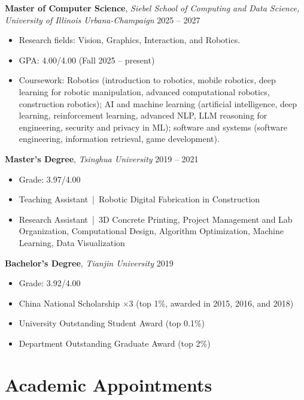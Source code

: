 \documentclass[11pt,a4paper]{article}
\newcommand{\entrytitle}[1]{\textbf{#1}}
\newcommand{\entrydetail}[1]{\textit{#1}}
\begin{document}
\entrytitle{Master of Computer Science}, \entrydetail{Siebel School of Computing and Data Science, University of Illinois Urbana-Champaign} \hfill 2025 -- 2027 \\[-1.5em]
\begin{itemize}[nosep, leftmargin=1.5em]
    \item Research fields: Vision, Graphics, Interaction, and Robotics.
    \item GPA: 4.00/4.00 (Fall 2025 -- present)
    \item Coursework: Robotics (introduction to robotics, mobile robotics, deep learning for robotic manipulation, advanced computational robotics, construction robotics); AI and machine learning (artificial intelligence, deep learning, reinforcement learning, advanced NLP, LLM reasoning for engineering, security and privacy in ML); software and systems (software engineering, information retrieval, game development).
\end{itemize}

\entrytitle{Master's Degree}, \entrydetail{Tsinghua University} \hfill 2019 -- 2021 \\[-1.5em]
\begin{itemize}[nosep, leftmargin=1.5em]
    \item Grade: 3.97/4.00
    \item Teaching Assistant \,|\, Robotic Digital Fabrication in Construction
    \item Research Assistant \,|\, 3D Concrete Printing, Project Management and Lab Organization, Computational Design, Algorithm Optimization, Machine Learning, Data Visualization
\end{itemize}

\entrytitle{Bachelor's Degree}, \entrydetail{Tianjin University} \hfill 2019 \\[-1.5em]
\begin{itemize}[nosep, leftmargin=1.5em]
    \item Grade: 3.92/4.00
    \item China National Scholarship $\times$3 (top 1\%, awarded in 2015, 2016, and 2018)
    \item University Outstanding Student Award (top 0.1\%)
    \item Department Outstanding Graduate Award (top 2\%)
\end{itemize}

\section{Academic Appointments}
\end{document}
